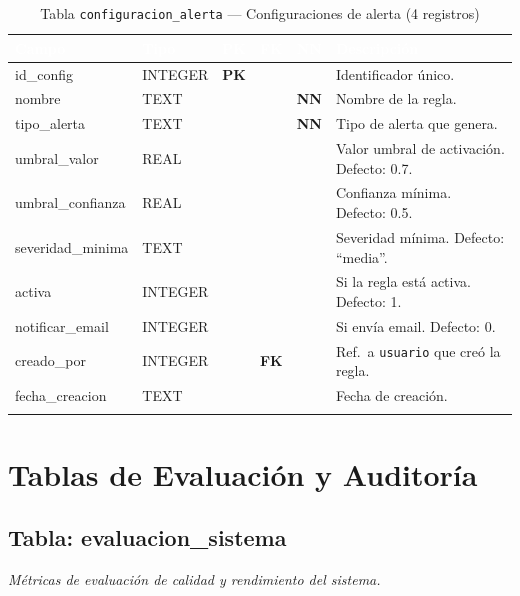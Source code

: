 \documentclass[11pt,a4paper]{article}
\newcommand{\tableheadrow}{\rowcolor{tableheader}}
\newcommand{\tablehead}[1]{\textcolor{white}{\textbf{#1}}}
\newcommand{\pk}{\textcolor{emiblue}{\textbf{PK}}}
\newcommand{\fk}{\textcolor{orange!80!black}{\textbf{FK}}}
\newcommand{\nn}{\textcolor{red!70!black}{\textbf{NN}}}
\begin{document}
\begin{longtable}{p{4.2cm} p{2.8cm} c c c p{4.5cm}}
\toprule
\tableheadrow
\tablehead{Campo} & \tablehead{Tipo} & \tablehead{PK} & \tablehead{FK} & \tablehead{NN} & \tablehead{Descripción} \\
\midrule
\endhead
id\_config & INTEGER & \pk & & & Identificador único. \\
\rowcolor{tablerow}
nombre & TEXT & & & \nn & Nombre de la regla. \\
tipo\_alerta & TEXT & & & \nn & Tipo de alerta que genera. \\
\rowcolor{tablerow}
umbral\_valor & REAL & & & & Valor umbral de activación. Defecto: 0.7. \\
umbral\_confianza & REAL & & & & Confianza mínima. Defecto: 0.5. \\
\rowcolor{tablerow}
severidad\_minima & TEXT & & & & Severidad mínima. Defecto: ``media''. \\
activa & INTEGER & & & & Si la regla está activa. Defecto: 1. \\
\rowcolor{tablerow}
notificar\_email & INTEGER & & & & Si envía email. Defecto: 0. \\
creado\_por & INTEGER & & \fk & & Ref.\ a \texttt{usuario} que creó la regla. \\
\rowcolor{tablerow}
fecha\_creacion & TEXT & & & & Fecha de creación. \\
\bottomrule
\caption{Tabla \texttt{configuracion\_alerta} — Configuraciones de alerta (4 registros)}
\end{longtable}

\section{Tablas de Evaluación y Auditoría}

\subsection{Tabla: evaluacion\_sistema}
\textit{Métricas de evaluación de calidad y rendimiento del sistema.}
\end{document}
